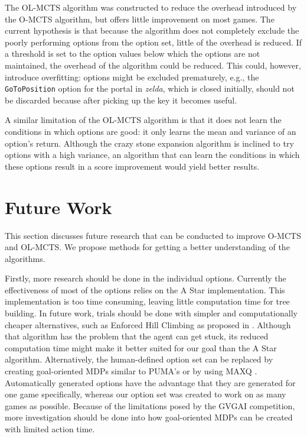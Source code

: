 The OL-MCTS algorithm was constructed to reduce the overhead introduced by the
O-MCTS algorithm, but offers little improvement on most games. The current
hypothesis is that because the algorithm does not completely exclude the poorly
performing options from the option set, little of the overhead is reduced.  If a
threshold is set to the option values below which the options are not
maintained, the overhead of the algorithm could be reduced. This could, however,
introduce overfitting: options might be excluded prematurely, e.g., the
\texttt{GoToPosition} option for the portal in \textit{zelda}, which is closed
initially, should not be discarded because after picking up the key it becomes
useful. 

A similar limitation of the OL-MCTS algorithm is that it does not learn the
conditions in which options are good: it only learns the mean and variance of an
option's return. Although the crazy stone expansion algorithm is inclined to try
options with a high variance, an algorithm that can learn the conditions in
which these options result in a score improvement would yield better results.

\section{Future Work}
This section discusses future research that can be conducted to improve O-MCTS
and OL-MCTS. We propose methods for getting a better understanding of the
algorithms. 

Firstly, more research should be done in the individual options. Currently the
effectiveness of most of the options relies on the A Star implementation.  This
implementation is too time consuming, leaving little computation time for tree
building. In future work, trials should be done with simpler and computationally
cheaper alternatives, such as Enforced Hill Climbing as proposed in
\cite{ross2014general}. Although that algorithm has the problem that the agent
can get stuck, its reduced computation time might make it better suited for our
goal than the A Star algorithm. Alternatively, the human-defined option set can
be replaced by creating goal-oriented MDPs similar to PUMA's \cite{he2010puma}
or by using MAXQ \cite{dietterich2000hierarchical}. Automatically generated
options have the advantage that they are generated for one game specifically,
whereas our option set was created to work on as many games as possible. Because
of the limitations posed by the GVGAI competition, more investigation should be
done into how goal-oriented MDPs can be created with limited action time.

